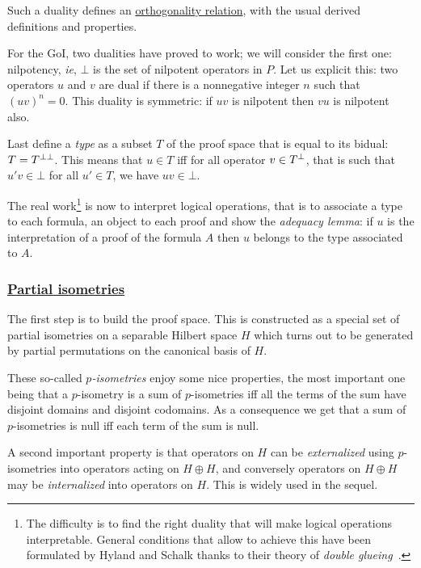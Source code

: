 {Such a duality defines an \hyperref[orthogonality-relation]{orthogonality relation}, with the usual derived definitions and properties.

For the GoI, two dualities have proved to work; we will consider the
first one: nilpotency, \emph{ie}, \(\bot\) is the set of nilpotent
operators in \(P\). Let us explicit this: two operators \(u\) and \(v\)
are dual if there is a nonnegative integer \(n\) such that
\((uv)^n = 0\). This duality is symmetric: if \(uv\) is nilpotent then
\(vu\) is nilpotent also.

Last define a \emph{type} as a subset \(T\) of the proof space that is
equal to its bidual: \(T = T^{\bot\bot}\). This means that \(u\in T\) iff
for all operator \(v\in T^\bot\), that is such that \(u'v\in\bot\) for
all \(u'\in T\), we have \(uv\in\bot\).

The real work\footnote{The difficulty is to find the right duality that
  will make logical operations interpretable. General conditions that
  allow to achieve this have been formulated by Hyland and Schalk
  thanks to their theory of \emph{double glueing}~\cite{doubleglueing}.}
is now to interpret logical operations, that is to
associate a type to each formula, an object to each proof and show the
\emph{adequacy lemma}: if \(u\) is the interpretation of a proof of the
formula \(A\) then \(u\) belongs to the type associated to \(A\).

\subsubsection{\texorpdfstring{\hyperref[goi-for-mell-partial-isometries]{Partial isometries}}{Partial isometries}}\label{partial-isometries}

The first step is to build the proof space. This is constructed as a
special set of partial isometries on a separable Hilbert space \(H\)
which turns out to be generated by partial permutations on the canonical
basis of \(H\).

These so-called \emph{\(p\)-isometries} enjoy some nice properties, the
most important one being that a \(p\)-isometry is a sum of
\(p\)-isometries iff all the terms of the sum have disjoint domains and
disjoint codomains. As a consequence we get that a sum of
\(p\)-isometries is null iff each term of the sum is null.

A second important property is that operators on \(H\) can be
\emph{externalized} using \(p\)-isometries into operators acting on
\(H\oplus H\), and conversely operators on \(H\oplus H\) may be
\emph{internalized} into operators on \(H\). This is widely used in the
sequel.

}
